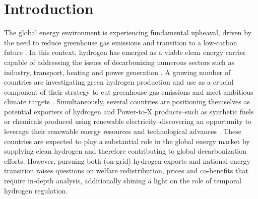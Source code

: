 \documentclass[5p,numafflabel]{elsarticle}
\begin{document}

\onecolumn

\linenumbers


\section*{Introduction}
\label{sec:intro}

The global energy environment is experiencing fundamental upheaval, driven by the need to reduce greenhouse gas emissions and transition to a low-carbon future \cite{Davis2018, Victoria2020}. 
In this context, hydrogen has emerged as a viable clean energy carrier capable of addressing the issues of decarbonizing numerous sectors such as industry, transport, heating and power generation \cite{IEA2021,Ueckerdt2021, Gailani2024, Kovac2021, Azadnia2023}. 
A growing number of countries are investigating green hydrogen production and use as a crucial component of their strategy to cut greenhouse gas emissions and meet ambitious climate targets \cite{IEA2021, Zeyen2023}.
Simultaneously, several countries are positioning themselves as potential exporters of hydrogen and Power-to-X products--such as synthetic fuels or chemicals produced using renewable electricity--discovering an opportunity to leverage their renewable energy resources and technological advances \cite{InternationalEnergyAgency2024}.
These countries are expected to play a substantial role in the global energy market by supplying clean hydrogen and therefore contributing to global decarbonization efforts\cite{InternationalEnergyAgency2024}. However, pursuing both (on-grid) hydrogen exports and national energy transition raises questions on welfare redistribution, prices and co-benefits that require in-depth analysis, additionally shining a light on the role of temporal hydrogen regulation.
\end{document}
